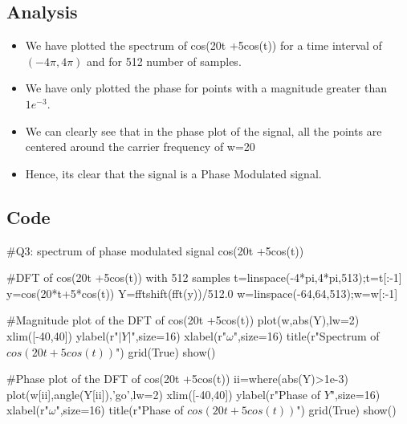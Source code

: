 \documentclass[11pt]{article}
\begin{document}
\subsection{Analysis}
\begin{itemize}
    \item We have plotted the spectrum of cos(20t +5cos(t)) for a time interval of $(-4\pi,4\pi)$ and for 512 number of samples.
    \item We have only plotted the phase for points with a magnitude greater than $1e^{-3}$.
    \item We can clearly see that in the phase plot of the signal, all the points are centered around the carrier frequency of w=20
    \item Hence, its clear that the signal is a Phase Modulated signal.
\end{itemize}

\subsection{Code}
\begin{python}

#Q3: spectrum of phase modulated signal cos(20t +5cos(t))

#DFT of cos(20t +5cos(t)) with 512 samples
t=linspace(-4*pi,4*pi,513);t=t[:-1]
y=cos(20*t+5*cos(t))
Y=fftshift(fft(y))/512.0
w=linspace(-64,64,513);w=w[:-1]

#Magnitude plot of the DFT of cos(20t +5cos(t))
plot(w,abs(Y),lw=2)
xlim([-40,40])
ylabel(r"$|Y|$",size=16)
xlabel(r"$\omega$",size=16)
title(r"Spectrum of $cos(20t +5cos(t))$")
grid(True)
show()

#Phase plot of the DFT of cos(20t +5cos(t))
ii=where(abs(Y)>1e-3)
plot(w[ii],angle(Y[ii]),'go',lw=2)
xlim([-40,40])
ylabel(r"Phase of $Y$",size=16)
xlabel(r"$\omega$",size=16)
title(r"Phase of $cos(20t +5cos(t))$")
grid(True)
show()
\end{python}
\end{document}
